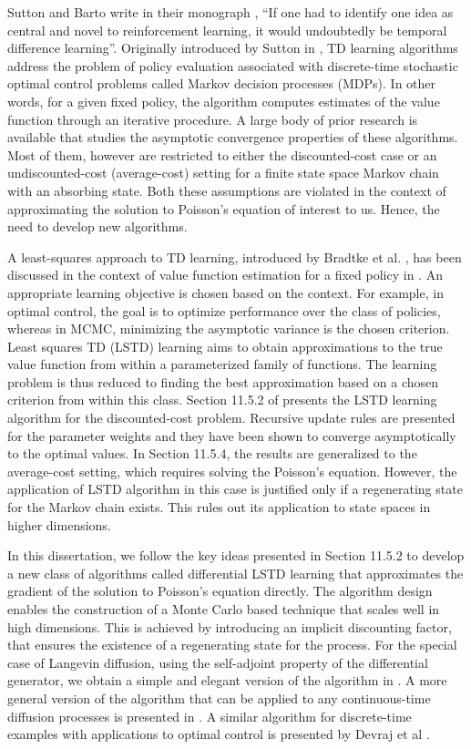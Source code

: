 Sutton and Barto write in their monograph \cite{sutbar98}, ``If one had to identify one idea as central and novel to reinforcement learning, it would undoubtedly be temporal difference learning''. Originally introduced by Sutton in \cite{sut88}, TD learning algorithms address the problem of policy evaluation associated with discrete-time stochastic optimal control problems called Markov decision processes (MDPs). In other words, for a given fixed policy, the algorithm computes estimates of the value function through an iterative procedure. A large body of prior research is available that studies the asymptotic convergence properties of these algorithms. Most of them, however are restricted to either the discounted-cost case or an undiscounted-cost (average-cost) setting for a finite state space Markov chain with an absorbing state. Both these assumptions are violated in the context of approximating the solution to Poisson's equation of interest to us. Hence, the need to develop new algorithms. 

A least-squares approach to TD learning, introduced by Bradtke et al. \cite{brabar96},  has been discussed in the context of value function estimation for a fixed policy in \cite{ctcn}. An appropriate learning objective is chosen based on the context. For example, in optimal control, the goal is to optimize performance over the class of policies, whereas in MCMC, minimizing the asymptotic variance is the chosen criterion. Least squares TD (LSTD) learning aims to obtain approximations to the true value function from within a parameterized family of functions. The learning problem is thus reduced to finding the best approximation based on a chosen criterion from within this class. Section 11.5.2 of \cite{ctcn} presents the LSTD learning algorithm for the discounted-cost problem. Recursive update rules are presented for the parameter weights and they have been shown to converge asymptotically to the optimal values. In Section 11.5.4, the results are generalized to the average-cost setting, which requires solving the Poisson's equation. However, the application of LSTD algorithm in this case is justified only if a regenerating state for the Markov chain exists. This rules out its application to state spaces in higher dimensions.

In this dissertation, we follow the key ideas presented in Section 11.5.2 to develop a new class of algorithms called differential LSTD learning that approximates the gradient of the solution to Poisson's equation directly.  The algorithm design enables the construction of a Monte Carlo based technique that scales well in high dimensions. This is achieved by introducing an implicit discounting factor, that ensures the existence of a regenerating state for the process. For the special case of Langevin diffusion, using the self-adjoint property of the differential generator, we obtain a simple and elegant version of the algorithm in .  A more general version of the algorithm that can be applied to any continuous-time diffusion processes is presented in . 
A similar algorithm for discrete-time examples with applications to optimal control is presented by Devraj et al \cite{devmey16arXiv}.
 
